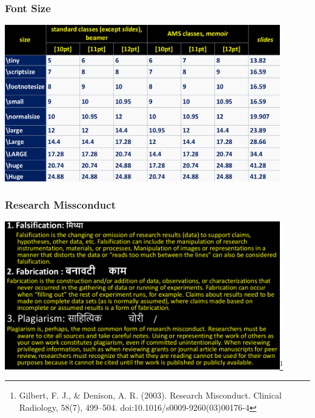 \documentclass{beamer}
\begin{document}
\begin{frame}
\frametitle{\bf Font Size}
\vspace*{0cm}
\centering
\includegraphics[width=12cm]{FS}
\end{frame}


\begin{frame}
\frametitle{\bf Research Missconduct}
\includegraphics[width=12cm]{MC}\footnote{Gilbert, F. J., \& Denison, A. R. (2003). Research Misconduct. Clinical Radiology, 58(7), 499–504. doi:10.1016/s0009-9260(03)00176-4 }
\end{frame}
\end{document}

